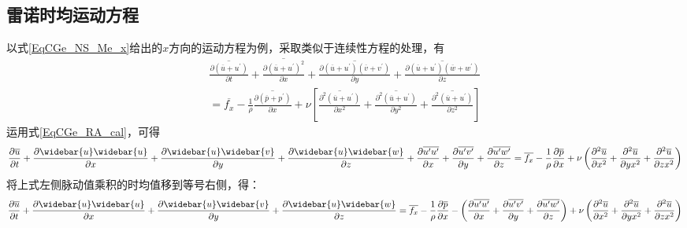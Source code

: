 \subsection{雷诺时均运动方程}
以式\eqref{EqCGe_NS_Me_x}给出的$x$方向的运动方程为例，采取类似于连续性方程的处理，有
\begin{equation*}
  \begin{aligned}
    \overline{
      \frac{\partial (\overline{u}+u^{\prime})}{\partial t}
    }
    +
    \overline{
      \frac{\partial (\overline{u}+u^{\prime})^{2}}{\partial x}
    }
    +
    \overline{
      \frac{\partial (\overline{u}+u^{\prime})(\overline{v}+v^{\prime})}{\partial y}
    }
    +
    \overline{
      \frac{\partial (\overline{u}+u^{\prime})(\overline{w}+w^{\prime})}{\partial z}
    }
    \\
    =
    \overline{f_{x}}
    -\frac{1}{\rho}
    \overline{
      \frac{\partial (\overline{p}+p^{\prime})}{\partial x}
    }
    +
    \nu
    \left[
      \overline{
        \frac{\partial^{2} (\overline{u}+u^{\prime})}{\partial x^{2}}
      }
      +
      \overline{
        \frac{\partial^{2} (\overline{u}+u^{\prime})}{\partial y^{2}}
      }
      +
      \overline{
        \frac{\partial^{2} (\overline{u}+u^{\prime})}{\partial z^{2}}
      }
    \right ]
  \end{aligned}
\end{equation*}
运用式\eqref{EqCGe_RA_cal}，可得
\begin{equation*}
  \frac{\partial \overline{u}}{\partial t} +
  \frac{\partial \widebar{u}\widebar{u}}{\partial x} +
  \frac{\partial \widebar{u}\widebar{v}}{\partial y} +
  \frac{\partial \widebar{u}\widebar{w}}{\partial z} +
  \frac{\partial \overline{u^{\prime}u^{\prime}}}{\partial x} +
  \frac{\partial \overline{u^{\prime}v^{\prime}}}{\partial y} +
  \frac{\partial \overline{u^{\prime}w^{\prime}}}{\partial z}
  =
  \overline{f_{x}}
  -\frac{1}{\rho}\frac{\partial \overline{p}}{\partial x} +
  \nu
  \left(
    \frac{\partial^{2} \overline{u}}{\partial x^{2}} +
    \frac{\partial^{2} \overline{u}}{\partial y x^{2}} +
    \frac{\partial^{2} \overline{u}}{\partial z x^{2}}
  \right)
\end{equation*}
将上式左侧脉动值乘积的时均值移到等号右侧，得：
\begin{equation}
  \frac{\partial \overline{u}}{\partial t} +
  \frac{\partial \widebar{u}\widebar{u}}{\partial x} +
  \frac{\partial \widebar{u}\widebar{v}}{\partial y} +
  \frac{\partial \widebar{u}\widebar{w}}{\partial z}
  =
  \overline{f_{x}}
  -\frac{1}{\rho}\frac{\partial \overline{p}}{\partial x} -
  \left(
    \frac{\partial \overline{u^{\prime}u^{\prime}}}{\partial x} +
    \frac{\partial \overline{u^{\prime}v^{\prime}}}{\partial y} +
    \frac{\partial \overline{u^{\prime}w^{\prime}}}{\partial z}
  \right)
  +
  \nu
  \left(
    \frac{\partial^{2} \overline{u}}{\partial x^{2}} +
    \frac{\partial^{2} \overline{u}}{\partial y x^{2}} +
    \frac{\partial^{2} \overline{u}}{\partial z x^{2}}
  \right)
  \label{EqCGe_Ra_Me_temp1}
\end{equation}
